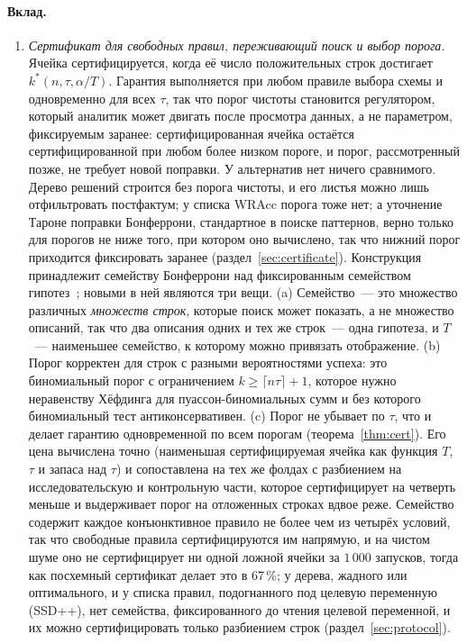 \documentclass[11pt]{article}
\begin{document}
\paragraph{Вклад.}
\begin{enumerate}
\item \emph{Сертификат для свободных правил, переживающий поиск и выбор порога.} Ячейка сертифицируется, когда её число положительных строк достигает $k^*(n,\tau,\alpha/T)$. Гарантия выполняется при любом правиле выбора схемы и одновременно для всех $\tau$, так что порог чистоты становится регулятором, который аналитик может двигать после просмотра данных, а не параметром, фиксируемым заранее: сертифицированная ячейка остаётся сертифицированной при любом более низком пороге, и порог, рассмотренный позже, не требует новой поправки. У альтернатив нет ничего сравнимого. Дерево решений строится без порога чистоты, и его листья можно лишь отфильтровать постфактум; у списка WRAcc порога тоже нет; а уточнение Тароне поправки Бонферрони, стандартное в поиске паттернов, верно только для порогов не ниже того, при котором оно вычислено, так что нижний порог приходится фиксировать заранее (раздел~\ref{sec:certificate}). Конструкция принадлежит семейству Бонферрони над фиксированным семейством гипотез~\citep{webb2007}; новыми в ней являются три вещи. (a) Семейство~--- это множество различных \emph{множеств строк}, которые поиск может показать, а не множество описаний, так что два описания одних и тех же строк~--- одна гипотеза, и $T$~--- наименьшее семейство, к которому можно привязать отображение. (b) Порог корректен для строк с разными вероятностями успеха: это биномиальный порог с ограничением $k\ge\lceil n\tau\rceil+1$, которое нужно неравенству Хёфдинга для пуассон-биномиальных сумм и без которого биномиальный тест антиконсервативен. (c) Порог не убывает по $\tau$, что и делает гарантию одновременной по всем порогам (теорема~\ref{thm:cert}). Его цена вычислена точно (наименьшая сертифицируемая ячейка как функция $T$, $\tau$ и запаса над $\tau$) и сопоставлена на тех же фолдах с разбиением на исследовательскую и контрольную части, которое сертифицирует на четверть меньше и выдерживает порог на отложенных строках вдвое реже. Семейство содержит каждое конъюнктивное правило не более чем из четырёх условий, так что свободные правила сертифицируются им напрямую, и на чистом шуме оно не сертифицирует ни одной ложной ячейки за $1\,000$ запусков, тогда как посхемный сертификат делает это в 67\,\%; у дерева, жадного или оптимального, и у списка правил, подогнанного под целевую переменную (SSD++), нет семейства, фиксированного до чтения целевой переменной, и их можно сертифицировать только разбиением строк (раздел~\ref{sec:protocol}).

\end{enumerate}
\end{document}
